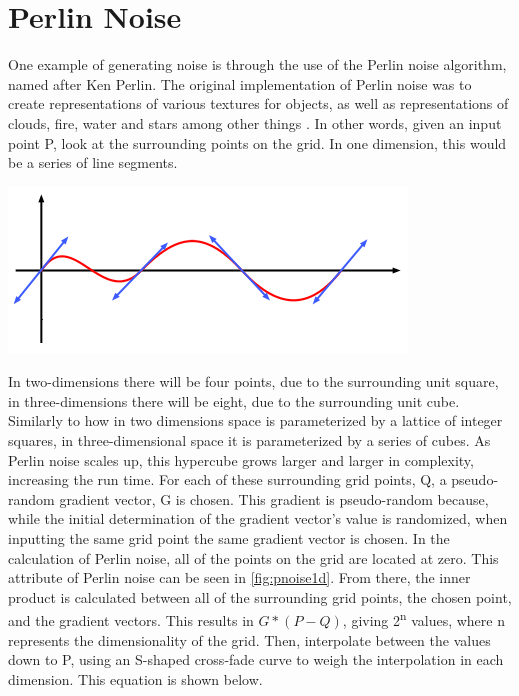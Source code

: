 \documentclass[10pt]{report}
\begin{document}
		\section{Perlin Noise}
	
		One example of generating noise is through the use of the Perlin noise algorithm, named after Ken Perlin. The original implementation of Perlin noise was to create representations of various textures for objects, as well as representations of clouds, fire, water and stars among other things \cite{10.1145/325165.325247}. In other words, given an input point P, look at the surrounding points on the grid. In one dimension, this would be a series of line segments. 
		
		\begin{minipage}{\textwidth}
			\centering
			\includegraphics[scale=.5]{noise-value-vs-perlin3}
			\label{fig:pnoise1d}
		\end{minipage} 
		
		In two-dimensions there will be four points, due to the surrounding unit square, in three-dimensions there will be eight, due to the surrounding unit cube. Similarly to how in two dimensions space is parameterized by a lattice of integer squares, in three-dimensional space it is parameterized by a series of cubes. As Perlin noise scales up, this hypercube grows larger and larger in complexity, increasing the run time. For each of these surrounding grid points, Q, a pseudo-random gradient vector, G is chosen. This gradient is pseudo-random because, while the initial determination of the gradient vector's value is randomized, when inputting the same grid point the same gradient vector is chosen. In the calculation of Perlin noise, all of the points on the grid are located at zero. This attribute of Perlin noise can be seen in \autoref{fig:pnoise1d}. From there, the inner product is calculated between all of the surrounding grid points, the chosen point, and the gradient vectors. This results in \(G * (P - Q)\), giving 2\textsuperscript{n} values, where n represents the dimensionality of the grid. Then, interpolate between the values down to P, using an S-shaped cross-fade curve to weigh the interpolation in each dimension. This equation is shown below.
		
\end{document}
